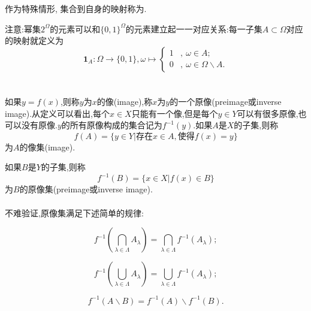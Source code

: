 \medskip
\begin{note}
	作为特殊情形, 集合到自身的映射称为.
\end{note}

注意:幂集$2^\Omega$的元素可以和$\{0,1\}^\Omega$的元素建立起一一对应关系:每一子集$A\subset \Omega$对应的映射就定义为\begin{equation}
\bm{1}_A:\Omega\rightarrow \{0,1\},\omega\mapsto\left\{
\begin{aligned}
1 &,~\omega\in A ;\\
0  &,~\omega\in \Omega\backslash A.
\end{aligned}
\right.
\end{equation}
\\ \hspace*{\fill} \\%
如果$y=f(x)$,则称$y$为$x$的像(image),称$x$为$y$的一个原像(preimage或inverse image).从定义可以看出,每个$x\in X$只能有一个像,但是每个$y\in Y$可以有很多原像,也可以没有原像.$y$的所有原像构成的集合记为$f^{-1}(y)$.如果$A$是$X$的子集,则称\begin{equation}
f(A) = \{y\in Y|\text{存在} x\in A,\text{使得}f(x)=y\}
\end{equation}
为$A$的像集(image).

如果$B$是$Y$的子集,则称\begin{equation}
f^{-1}(B) = \{x\in X|f(x)\in B\}
\end{equation}
为$B$的原像集(preimage或inverse image).
\\ \hspace*{\fill} \\%
不难验证,原像集满足下述简单的规律:
\begin{blist}
	\item \begin{equation}
	f^{-1}\left(\bigcap_{\lambda\in\Lambda}A_{\lambda} \right) = \bigcap_{\lambda\in\Lambda}f^{-1}\left(A_{\lambda}\right);
	\end{equation}
	\item \begin{equation}
	f^{-1}\left(\bigcup_{\lambda\in\Lambda}A_{\lambda} \right) = \bigcup_{\lambda\in\Lambda}f^{-1}\left(A_{\lambda}\right);
	\end{equation}
	\item \begin{equation}
	f^{-1}(A\backslash B) = f^{-1}(A) \backslash f^{-1}(B).
	\end{equation}
\end{blist}

